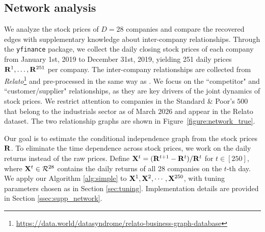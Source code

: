\documentclass[11pt,a4paper,final]{article}
\numberwithin{equation}{section}
\theoremstyle{remark}
\newcommand{\bR}{{\bf R}}
\newcommand{\bX}{{\bf X}}
\begin{document}


\subsection{Network analysis}
\label{ssec:network}

We analyze the stock prices of $D = 28$ companies and compare the recovered edges with supplementary knowledge about inter-company relationships. Through the \texttt{yfinance} package, we collect the daily closing stock prices of each company from January 1st, 2019 to December 31st, 2019, yielding 251 daily prices $\bR^{1}, \ldots, \bR^{251}$ per company. The inter-company relationships are collected from \textit{Relato}\footnote{\url{https://data.world/datasyndrome/relato-business-graph-database}} and pre-processed in the same way as \cite{xu2023covariate}. We focus on the ``competitor" and ``customer/supplier" relationships, as they are key drivers of the joint dynamics of stock prices. We restrict attention to companies in the Standard \& Poor's $500$ that belong to the industrials sector as of March $2026$ and appear in the Relato dataset. The two relationship graphs are shown in Figure~\ref{figure:network_true}.

Our goal is to estimate the conditional independence graph from the stock prices $\bR$. 
To eliminate the time dependence across stock prices, we work on the daily returns instead of the raw prices. Define $\bX^t = (\bR^{t+1} - \bR^{t})/\bR^t$ for $t \in [250]$, where $\bX^t \in \mathcal{R}^{28}$ contains the daily returns of all 28 companies on the $t$-th day. We apply our Algorithm \ref{alg:simple} to $\bX^{1}, \bX^2, \cdots, \bX^{250}$, with tuning parameters chosen as in Section \ref{sec:tuning}. 
Implementation details are provided in Section \ref{ssec:supp_network}. 
\end{document}
